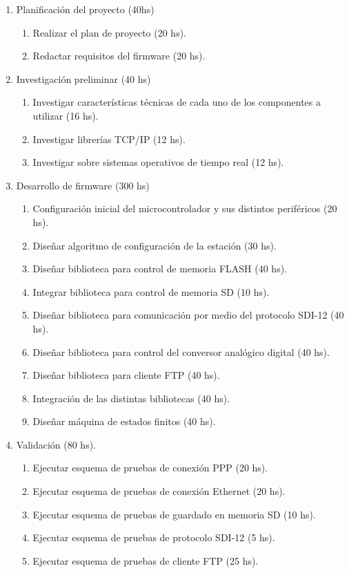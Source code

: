 \documentclass[
11pt, %
]{charter}
\begin{document}
\begin{enumerate}
\item Planificación del proyecto (40hs)
	\begin{enumerate}
	\item Realizar el plan de proyecto (20 hs).
	\item Redactar requisitos del firmware (20 hs).
	\end{enumerate}
\item Investigación preliminar (40 hs)
	\begin{enumerate}
	\item Investigar características técnicas de cada uno de los componentes a utilizar (16 hs).
	\item Investigar librerías TCP/IP (12 hs).
	\item Investigar sobre sistemas operativos de tiempo real (12 hs).
	\end{enumerate}
\item Desarrollo de firmware (300 hs)
	\begin{enumerate}
	\item Configuración inicial del microcontrolador y sus distintos periféricos (20 hs). 
	\item Diseñar algoritmo de configuración de la estación (30 hs).
	\item Diseñar biblioteca para control de memoria FLASH (40 hs).
	\item Integrar biblioteca para control de memoria SD (10 hs).
	\item Diseñar biblioteca para comunicación por medio del protocolo SDI-12 (40 hs).
	\item Diseñar biblioteca para control del conversor analógico digital (40 hs).
	\item Diseñar biblioteca para cliente FTP (40 hs).
	\item Integración de las distintas bibliotecas (40 hs).
	\item Diseñar máquina de estados finitos (40 hs).
	\end{enumerate}
\item Validación (80 hs).
	\begin{enumerate}
	\item Ejecutar esquema de pruebas de conexión PPP (20 hs).
	\item Ejecutar esquema de pruebas de conexión Ethernet (20 hs).
	\item Ejecutar esquema de pruebas de guardado en memoria SD (10 hs).
	\item Ejecutar esquema de pruebas de protocolo SDI-12 (5 hs).
	\item Ejecutar esquema de pruebas de cliente FTP (25 hs).


\end{enumerate}
\end{enumerate}
\end{document}
